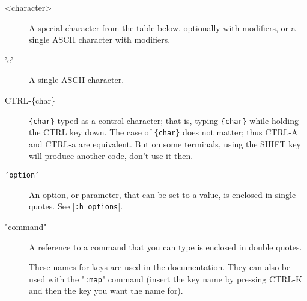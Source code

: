 \begin{description}
				\item[<character>]
								\label{<character>}
								A special character from the table below, optionally with modifiers, or a single ASCII character with modifiers.

				\item['c']
								\label{'character'}
								A single ASCII character.

				\item[CTRL-\{char\}]
								\label{CTRL-{char}}
								\texttt{\{char\}} typed as a control character; that is, typing \texttt{\{char\}} while holding the CTRL key down.
								The case of \texttt{\{char\}} does not matter; thus CTRL-A and CTRL-a are equivalent.
								But on some terminals, using the SHIFT key will produce another code, don't use it then.

				\item[\texttt{'option'}]
								\label{'option'}
								An option, or parameter, that can be set to a value, is enclosed in single quotes.
								See |\texttt{:h options}|.

				\item["command"]
								\label{quotecommandquote}
								A reference to a command that you can type is enclosed in double quotes.

				\item[]
								\label{key-notation}
								\label{key-codes}
								\label{keycodes}
These names for keys are used in the documentation.
They can also be used with the "\texttt{:map}" command (insert the key name by pressing CTRL-K and then the key you want the name for).

\begin{tabularx}{\textwidth}{|c|X|c|c|c|} %
	

\end{tabularx}
\end{description}
